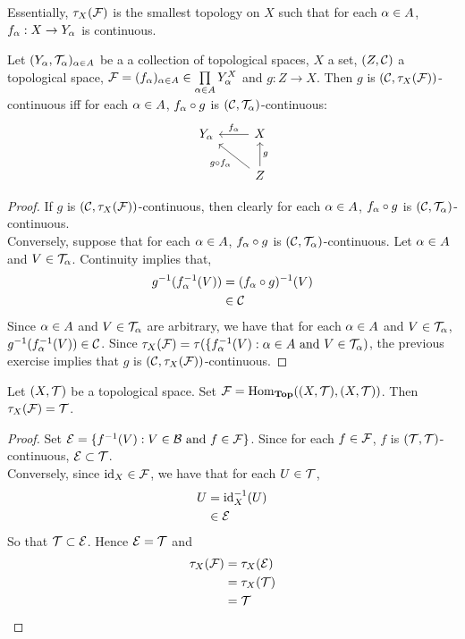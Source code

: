 \documentclass{book}
\begin{document}
	\begin{note}
	Essentially, $\tau_X(\mathcal{F})$ is the smallest topology on $X$ such that for each $\alpha \in A$, $f_{\alpha}:X \rightarrow Y_{\alpha}$ is continuous. 
	\end{note}

	\begin{ex} 
		Let $(Y_{\alpha}, \mathcal{T}_{\alpha})_{\alpha \in A}$ be a a collection of topological spaces, $X$ a set, $(Z, \mathcal{C})$ a topological space, $\mathcal{F} = (f_{\alpha})_{\alpha \in A} \in \prod \limits_{\alpha \in A}Y_{\alpha}^X$ and $g: Z \rightarrow X$. Then $g$ is $(\mathcal{C},\tau_X(\mathcal{F}))$-continuous iff for each $\alpha \in A$, $f_{\alpha} \circ g$ is $(\mathcal{C}, \mathcal{T}_{\alpha})$-continuous:
		\[ \begin{tikzcd}
			Y_{\al}	
			& X  \arrow[l, "f_{\al}"'] \\
			& Z \arrow[ul, "g \circ f_{\al}"]  \arrow[u, "g"']
		\end{tikzcd}
		\]
	\end{ex}
	
	\begin{proof}
		If $g$ is $(\mathcal{C},\tau_X(\mathcal{F}))$-continuous, then clearly for each $\alpha \in A$, $ f_{\alpha} \circ g$ is $(\mathcal{C}, \mathcal{T}_{\alpha})$- continuous. \\
		Conversely, suppose that for each $\alpha \in A$, $f_{\alpha} \circ g$ is $(\mathcal{C}, \mathcal{T}_{\alpha})$-continuous. Let $\alpha \in A$ and $V \in \mathcal{T}_{\alpha}$. Continuity implies that,
		\begin{align*}
			g^{-1}(f_{\alpha}^{-1}(V)) 
			& = (f_{\alpha} \circ g)^{-1}(V) \\
			& \in \mathcal{C}
		\end{align*}
		Since $\alpha \in A$ and $V \in \mathcal{T}_{\alpha}$ are arbitrary, we have that for each $\alpha \in A$ and $V \in \mathcal{T}_{\alpha}$, $g^{-1}(f_{\alpha}^{-1}(V)) \in \mathcal{C}$. Since $\tau_X(\mathcal{F}) = \tau(\{f_{\alpha}^{-1}(V): \alpha \in A \text{ and } V \in \mathcal{T}_{\alpha})$, the previous exercise implies that $g$ is $(\mathcal{C},\tau_X(\mathcal{F}))$-continuous.
	\end{proof}

	\begin{ex} 
		Let $(X, \mathcal{T})$ be a topological space. Set $\mathcal{F} = \operatorname{Hom}_{\operatorname*{\text{\textbf{Top}}}}((X, \mathcal{T}), (X, \mathcal{T}))$. Then $\tau_X(\mathcal{F}) = \mathcal{T}$.
	\end{ex}

	\begin{proof}
		Set $\mathcal{E} = \{f^{-1}(V): V \in \mathcal{B} \text{ and } f \in \mathcal{F} \}$. Since for each $f \in \mathcal{F}$, $f$ is $(\mathcal{T}, \mathcal{T})$-continuous, $\mathcal{E} \subset \mathcal{T}$. \\
		Conversely, since $\operatorname{id}_X \in \mathcal{F}$, we have that for each $U \in \mathcal{T}$, 
		\begin{align*}
			U
			& = \operatorname{id}_X^{-1}(U) \\
			& \in \mathcal{E} 
		\end{align*}
		So that $\mathcal{T} \subset \mathcal{E}$. Hence $\mathcal{E} = \mathcal{T}$ and 
		\begin{align*}
			\tau_X(\mathcal{F})
			& = \tau_X(\mathcal{E}) \\
			& = \tau_X(\mathcal{T}) \\
			& = \mathcal{T}
		\end{align*}
	\end{proof}
	
\end{document}

